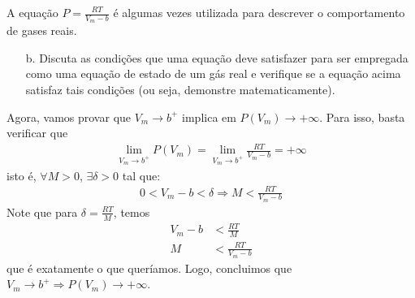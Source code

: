 \begin{xcs}
    A equação \( P = \frac{RT}{V_m - b} \) é algumas vezes utilizada para
    descrever o comportamento de gases reais. 
    \begin{enumerate}[label=\alph*.]
        \item[b.] Discuta as condições que uma equação deve satisfazer para ser
            empregada como uma equação de estado de um gás real e verifique se a
            equação acima satisfaz tais condições (ou seja, demonstre
            matematicamente). 
    \end{enumerate}
\end{xcs}
\begin{rsl}

    Agora, vamos provar que \( V_m \to b^+ \) implica em \( P(V_m) \to +\infty \).
    Para isso, basta verificar que 
    \begin{align*}
        \lim_{V_m \to b^+} P(V_m) = \lim_{V_m \to b^+} \frac{RT}{V_m-b} = +\infty
    \end{align*}
    isto é, \( \forall M > 0 \), \( \exists \delta > 0 \) tal que:
    \begin{align*}
        0 < V_m - b < \delta \Rightarrow M < \frac{RT}{V_m-b}
    \end{align*}
    Note que para \( \delta = \frac{RT}{M} \), temos
    \begin{align*}
        V_m - b &< \frac{RT}{M}\\
        M &< \frac{RT}{V_m - b} 
    \end{align*}
    que é exatamente o que queríamos. Logo, concluimos que \( V_m \to b^+
    \Rightarrow P(V_m) \to +\infty \).
\end{rsl}

